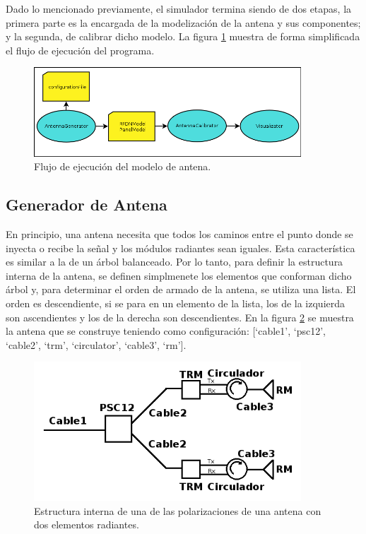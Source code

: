 Dado lo mencionado previamente, el simulador termina siendo de dos etapas, la primera parte es la encargada de la modelización
de la antena y sus componentes; y la segunda, de calibrar dicho modelo. La figura \ref{fig:prog_inic} muestra de forma 
simplificada el flujo de ejecuci\'on del programa.

\begin{figure}
 \centering
 \includegraphics[width=10cm]{gfx/FlujoEjecucion.png}
 \caption{Flujo de ejecuci\'on del modelo de antena.}
 \label{fig:prog_inic}
\end{figure}


\subsection{Generador de Antena}

En principio, una antena necesita que todos los caminos entre el punto donde se inyecta o recibe la se\~nal y los m\'odulos 
radiantes sean iguales. Esta caracter\'istica es similar a la de un \'arbol balanceado. Por lo tanto, para definir la 
estructura interna de la antena, se definen simplmenete los elementos que conforman dicho \'arbol y, para determinar el orden 
de armado de la antena, se utiliza una lista. El orden es descendiente, si se para en un elemento de la lista, los de la 
izquierda son ascendientes y los de la derecha son descendientes. En la figura \ref{fig:2RMAntenna} se muestra la antena que 
se construye teniendo como configuración: [\enquote*{cable1}, \enquote*{psc12}, \enquote*{cable2}, \enquote*{trm}, 
\enquote*{circulator}, \enquote*{cable3}, \enquote*{rm}].

\begin{figure}
 \centering
 \includegraphics[width=10cm]{gfx/RFDN.png}
 \caption{Estructura interna de una de las polarizaciones de una antena con dos elementos radiantes.}
 \label{fig:2RMAntenna}
\end{figure}

